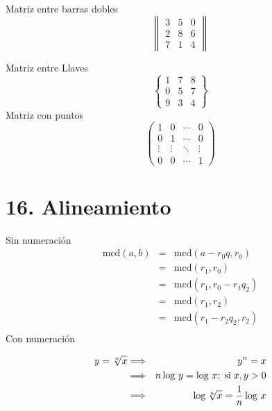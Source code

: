 \documentclass{article} %
\begin{document}
Matriz entre barras dobles
\begin{equation*}
    \begin{Vmatrix}
    3 & 5 & 0\\
    2 & 8 & 6\\
    7 & 1 & 4
    \end{Vmatrix}
\end{equation*}

Matriz entre Llaves
\begin{equation*}
    \begin{Bmatrix}
    1 & 7 & 8\\
    0 & 5 & 7\\
    9 & 3 & 4
    \end{Bmatrix}
\end{equation*}
Matriz con puntos
\begin{equation*}
    \begin{pmatrix}
    1 & 0 & \cdots & 0\\
    0 & 1 & \cdots & 0\\
    \vdots & \vdots & \ddots & \vdots\\
    0 & 0 & \cdots & 1
    \end{pmatrix}
\end{equation*}
    

\section*{16. Alineamiento}
Sin numeración 
\begin{eqnarray*} %
    \mbox{mcd}(a,b) & = & \mbox{mcd}(a-r_0q,r_0) \\[0.2cm]
    & = & \mbox{mcd}(r_1,r_0) \\[0.2cm]
    & = & \mbox{mcd}(r_1,r_0-r_1q_2)\\[0.2cm]
    & = & \mbox{mcd}(r_1,r_2) \\[0.2cm]
    & = & \mbox{mcd}(r_1-r_2q_2,r_2)\\[0.2cm]
\end{eqnarray*}
Con numeración 

\begin{eqnarray}
    y=\sqrt[n]{x} &\Longrightarrow &y^n=x \\
    &\Longrightarrow &n\log\,y=\log\,x;\;\mbox{si}\; x,y>0\\
    &\Longrightarrow &\log \sqrt[n]{x}={1 \over n}\log \,x
\end{eqnarray}
\end{document}
